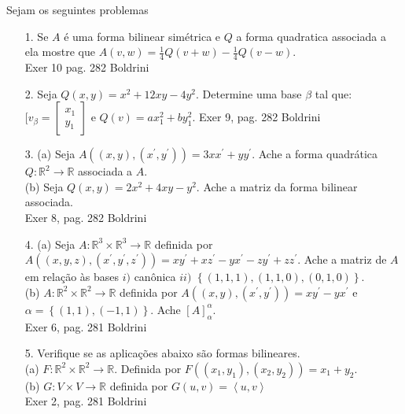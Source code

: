 Sejam os seguintes problemas

\begin{itemize}
	\item[1.] Se $A$ é uma forma bilinear simétrica e $Q$ a forma quadratica associada a ela mostre que $A(v,w)=\frac{1}{4}Q(v+w)-\frac{1}{4}Q(v-w)$.\\
	Exer 10 pag. 282 Boldrini 
\end{itemize}
\begin{itemize}
	\item[2.] Seja $Q(x,y)=x^{2}+12xy-4y^{2}$. Determine uma base $\beta$ tal que: $[v_{\beta}=\begin{bmatrix}
	x_{1}  \\
	y_{1}  
	\end{bmatrix}$ e $Q(v)=ax_{1}^{2}+by_{1}^{2}$.
	 Exer 9, pag. 282 Boldrini
\end{itemize}

\begin{itemize}
	\item [3.] (a) Seja $A((x,y),(x^{'},y^{'}))=3xx^{'}+yy^{'}$. Ache a forma quadrática $Q:\mathbb{R}^{2}\longrightarrow \mathbb{R}$ associada a $A$.\\ (b) Seja $Q(x,y)=2x^{2}+4xy-y^{2}$. Ache a matriz da forma bilinear associada.\\ 
     Exer 8, pag. 282 Boldrini
\end{itemize}
\begin{itemize}
	\item[4.] (a) Seja $A:\mathbb{R}^{3}\times\mathbb{R}^{3} \longrightarrow \mathbb{R} $ definida por $A((x,y,z),(x^{'},y^{'},z^{'}))=xy^{'}+xz^{'}-yx^{'}-zy^{'}+zz^{'}$. Ache a matriz de $A$ em relação às bases $i)$ canônica $ii)$ $ \left\lbrace  (1,1,1), (1,1,0), (0,1,0) \right\rbrace $.\\
	(b) $A:\mathbb{R}^{2}\times\mathbb{R}^{2} \longrightarrow \mathbb{R} $ definida por  $A((x,y),(x^{'},y^{'}))=xy^{'}-yx^{'}$ e $\alpha= \left\lbrace  (1,1), (-1,1) \right\rbrace $. Ache $[A]_{\alpha}^{\alpha}$.\\
 Exer 6, pag. 281 Boldrini
\end{itemize}
\begin{itemize}
	\item[5.] Verifique se as aplicações abaixo são formas bilineares.\\
	(a) $F:\mathbb{R}^{2}\times\mathbb{R}^{2} \longrightarrow \mathbb{R} $. Definida por $F((x_{1},y_{1}),(x_{2},y_{2}))=x_{1}+y_{2}$.\\
	(b) $G:V\times V \longrightarrow \mathbb{R} $ definida por $G(u,v)=\left\langle u,v \right\rangle $\\
 Exer 2, pag. 281 Boldrini	
\end{itemize}

